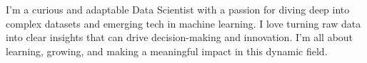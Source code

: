 
\begin{cvparagraph}

I’m a curious and adaptable Data Scientist with a passion for diving deep into complex datasets and emerging tech in machine learning. I love turning raw data into clear insights that can drive decision-making and innovation. I’m all about learning, growing, and making a meaningful impact in this dynamic field.
\vspace{-2mm}
\end{cvparagraph}

